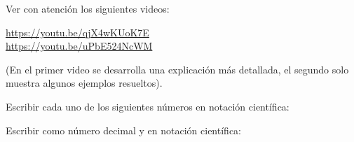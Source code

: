 \documentclass[12pt]{exam}
\begin{document}
\begin{questions}

    \question Ver con atención los siguientes videos:
     
         \url{https://youtu.be/qjX4wKUoK7E} \\
         \url{https://youtu.be/uPbE524NcWM}
    
    (En el primer video se desarrolla una explicación más detallada, el segundo solo muestra algunos ejemplos resueltos).

    \question Escribir cada uno de los siguientes números en notación científica:
    \begin{parts}
    \end{parts}


    \question Escribir como número decimal y en notación científica:
    \begin{parts}
\end{parts}
\end{questions}
\end{document}
